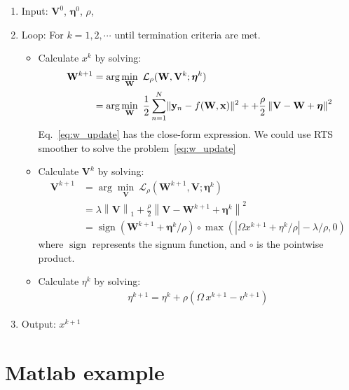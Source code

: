 \documentclass[11pt,a4paper]{article}
\begin{document}
\begin{enumerate}
\item Input: $ \mathbf{V}^0$, $\bm\eta^0$, $\rho$,
\item Loop: For $k=1,2,\cdots$ until termination criteria are met.
\begin{itemize}
\item Calculate $x^k $ by solving: 
\begin{equation}
\label{eq:w_update}
\begin{split}
\
\mathbf{W}^{k+1} &= \arg \min_{\mathbf{W}} \ \mathcal{L_\rho} (\mathbf{W},\mathbf{V}^k;\bm\eta^k) \\
        &= \arg \min_{\mathbf{W}}  \   
        \frac{1}{2} \sum_{n=1}^N \lVert\mathbf{y}_n - f(\mathbf{W}, \mathbf{x})\rVert^2 + 
          + \frac{\rho}{2} \left\| \mathbf{V} - \mathbf{W} + \bm\eta \right\|^2 
\end{split}
\end{equation}
Eq.~\ref{eq:w_update} has the close-form expression. We could use RTS smoother to solve the problem~\eqref{eq:w_update} 

\item Calculate $\mathbf{V}^k $ by solving: 
\begin{equation}
\begin{split}
\mathbf{V}^{k+1} &= \arg \min_\mathbf{V} \ \mathcal{L_\rho}(\mathbf{W}^{k+1},\mathbf{V};\bm\eta^k)  \\
&= \lambda \left \| \mathbf{V} \right \|_1+\frac{\rho}{2}\left \| \mathbf{V}- \mathbf{W}^{k+1} + \bm\eta^{k}\right \|^2 \\
&= \operatorname{sign}(\mathbf{W}^{k+1} + \bm\eta^k/\rho) \circ \operatorname{max} (|\Omega x^{k+1} + \eta^k/\rho|-{\lambda}/{\rho},0 )
\end{split}
\end{equation}
where $\operatorname{sign}$ represents the signum function, and $\circ$ is the pointwise product. 
\item Calculate $\eta^k $ by solving:
\begin{equation}
\begin{split} 
\eta^{k+1}= \eta^{k}+ \rho (\Omega\,x^{k+1} -v^{k+1} )
\end{split}
\end{equation}
\end{itemize}
\item Output: $x^{k+1}$
\end{enumerate}




\section{Matlab example}
% 

{}

\end{document}
